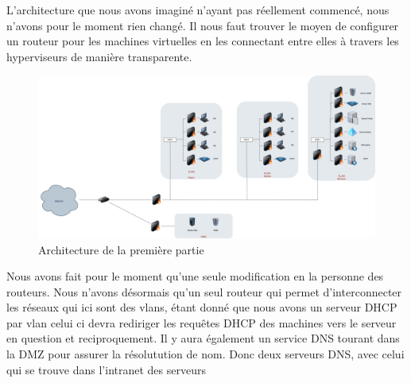 \documentclass[../file.tex]{subfiles}
\begin{document}
	
L'architecture que nous avons imaginé n'ayant pas réellement commencé, nous n'avons pour le moment 
rien changé. Il nous faut trouver le moyen de configurer un routeur pour les machines virtuelles en les connectant 
entre elles à travers les hyperviseurs de manière transparente.

\begin{figure}[h]
    \centering
    \includegraphics[width=1\textwidth]{../Images/Architecture.png}
    \caption{Architecture de la première partie}
    \label{fig:solution1}
\end{figure}

Nous avons fait pour le moment qu'une seule modification en la personne des routeurs. Nous n'avons désormais qu'un 
seul routeur qui permet d'interconnecter les réseaux qui ici sont des vlans, étant donné que nous avons un serveur DHCP 
par vlan celui ci devra rediriger les requêtes DHCP des machines vers le serveur en question et reciproquement.
Il y aura également un service DNS tourant dans la DMZ pour assurer la résolutution de nom. Donc deux serveurs DNS, 
avec celui qui se trouve dans l'intranet des serveurs
\end{document}

